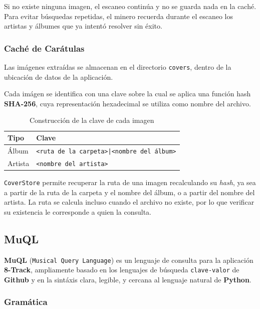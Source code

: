 Si no existe ninguna imagen, el escaneo continúa y no se guarda nada en la caché. Para evitar
búsquedas repetidas, el minero recuerda durante el escaneo los artistas y álbumes que ya intentó resolver sin éxito.

\subsubsection*{Caché de Carátulas}

Las imágenes extraídas se almacenan en el directorio \texttt{covers}, dentro de la ubicación de datos
de la aplicación.

Cada imágen se identifica con una clave sobre la cual se aplica una función hash \textbf{SHA-256}, cuya representación
hexadecimal se utiliza como nombre del archivo.

\begin{table}[htbp]
	\centering
	\begin{tabular}{ll}
		\hline
		\textbf{Tipo} & \textbf{Clave}                                   \\
		\hline
		Álbum         & \texttt{<ruta de la carpeta>|<nombre del álbum>} \\
		Artista       & \texttt{<nombre del artista>}                    \\
		\hline
	\end{tabular}
	\caption{Construcción de la clave de cada imagen}
\end{table}

\texttt{CoverStore} permite recuperar la ruta de una imagen recalculando su \textit{hash}, ya sea a
partir de la ruta de la carpeta y el nombre del álbum, o a partir del nombre del artista.
La ruta se calcula incluso cuando el archivo no existe, por lo que verificar su existencia
le corresponde a quien la consulta.

\subsection{MuQL}

\textbf{MuQL} (\texttt{Musical Query Language}) es un lenguaje de consulta para la aplicación \textbf{8-Track},
ampliamente basado en los lenguajes de búsqueda \texttt{clave-valor} de \textbf{Github} y en la
sintáxis clara, legible, y cercana al lenguaje natural de \textbf{Python}.

\subsubsection*{Gramática}

